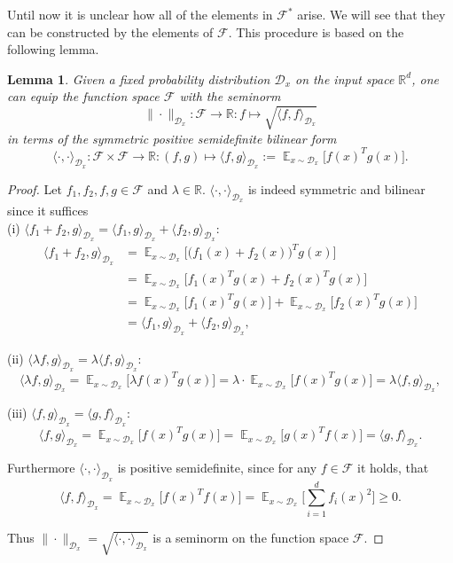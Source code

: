 \documentclass[11pt, a4paper]{article}
\newtheorem{lemma}[theorem]{Lemma}
\newcommand{\R}{\mathds{R}}
\newcommand{\D}{\mathcal{D}}
\newcommand{\F}{\mathcal{F}}
\DeclareMathOperator*{\E}{\mathds{E}}
\begin{document}
Until now it is unclear how all of the elements in $\F^*$ arise. We will see that they can be constructed by the elements of $\F$. This procedure is based on the following lemma.

\begin{lemma}
Given a fixed probability distribution $\D_x$ on the input space $\R^d$, one can equip the function space $\F$ with the seminorm
\[ \| \cdot \|_{\D_x} : \F \to \R : f \mapsto \sqrt{\langle f , f \rangle_{\D_x}} \] 
in terms of the symmetric positive semidefinite bilinear form
\[ \langle \cdot,\cdot \rangle_{\D_x} : \F \times \F \to \R : (f,g) \mapsto \langle f,g \rangle_{\D_x} := \E_{x \sim \D_x} \Big [ f(x)^Tg(x) \Big ].\]
\end{lemma}

\begin{proof}
Let $f_1, f_2, f, g \in \F$ and $\lambda \in \R$. $\langle \cdot,\cdot \rangle_{\D_x}$ is indeed symmetric and bilinear since it suffices \\

(i) $\langle f_1 + f_2 , g \rangle_{\D_x} = \langle f_1 , g \rangle_{\D_x} + \langle f_2 , g \rangle_{\D_x}$:
\[ \begin{split}
\langle f_1 + f_2 , g \rangle_{\D_x}
&= \E_{x \sim \D_x} \Big [ \big ( f_1(x) + f_2(x) \big )^Tg(x) \Big ] \\\
&= \E_{x \sim \D_x} \Big [ f_1(x)^Tg(x) + f_2(x)^Tg(x) \Big ] \\\
&= \E_{x \sim \D_x} \Big [ f_1(x)^Tg(x) \Big ] + \E_{x \sim \D_x} \Big [ f_2(x)^Tg(x) \Big ] \\\
&= \langle f_1 , g \rangle_{\D_x} + \langle f_2 , g \rangle_{\D_x},
\end{split} \]

(ii) $\langle \lambda f , g \rangle_{\D_x} = \lambda \langle f, g \rangle_{\D_x}$:
\[ \langle \lambda f , g \rangle_{\D_x} = \E_{x \sim \D_x} \Big [ \lambda f(x)^Tg(x) \Big ] = \lambda \cdot \E_{x \sim \D_x} \Big [ f(x)^Tg(x) \Big ] = \lambda \langle f, g \rangle_{\D_x}, \]

(iii) $\langle f , g \rangle_{\D_x} = \langle g , f \rangle_{\D_x}$:
\[ \langle f , g \rangle_{\D_x} = \E_{x \sim \D_x} \Big [ f(x)^Tg(x) \Big ] = \E_{x \sim \D_x} \Big [ g(x)^Tf(x) \Big ] = \langle g , f \rangle_{\D_x}. \]

Furthermore $\langle \cdot,\cdot \rangle_{\D_x}$ is positive semidefinite, since for any $f \in \F$ it holds, that
\[ \langle f , f \rangle_{\D_x} =  \E_{x \sim \D_x} \Big [ f(x)^Tf(x) \Big ] = \E_{x \sim \D_x} \Big [ \sum_{i=1}^{d} f_i(x)^2 \Big ] \geq 0. \]

Thus $\| \cdot \|_{\D_x} = \sqrt{\langle \cdot , \cdot \rangle_{\D_x}}$ is a seminorm on the function space $\F$.
\end{proof}
\end{document}
